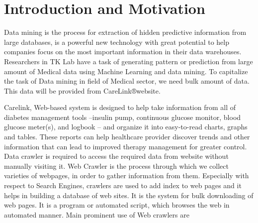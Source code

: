 \documentclass[12pt]{report}
\begin{document}
\newpage

\section*{Introduction and Motivation}
Data mining is the process for extraction of hidden predictive information from large databases, is a powerful new technology with great potential to help companies focus on the most important information in their data warehouses. Researchers in TK Lab have a task of generating pattern or prediction from large amount of Medical data using Machine Learning and data mining. To capitalize the task of Data mining in field of Medical sector, we need bulk amount of data. This data will be provided from CareLink®website. 

Carelink, Web-based system is designed to help take information from all of diabetes management tools –insulin pump, continuous glucose monitor, blood glucose meter(s), and logbook – and organize it into easy-to-read charts, graphs and tables. These reports can help healthcare provider discover trends and other information that can lead to improved therapy management for greater control.
Data crawler is required to access the required data from website without manually visiting it. Web Crawler is the process through which we collect varieties of webpages, in order to gather information from them. Especially with respect to Search Engines, crawlers are used to add index to web pages and it helps in building a database of web sites. It is the system for bulk downloading of web pages. It is a program or automated script, which browses the web in automated manner. Main prominent use of Web crawlers are 
\end{document}
